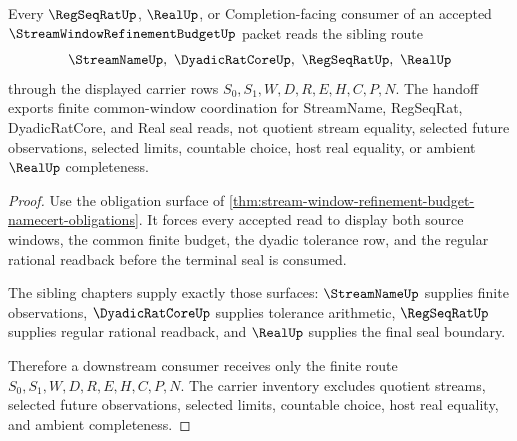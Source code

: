 \begin{theorem}
\label{thm:stream-window-refinement-budget-real-handoff}
Every $\RegSeqRatUp$, $\RealUp$, or Completion-facing consumer of an accepted $\StreamWindowRefinementBudgetUp$ packet reads the sibling route
$$
\StreamNameUp,\ \DyadicRatCoreUp,\ \RegSeqRatUp,\ \RealUp
$$
through the displayed carrier rows $S_0,S_1,W,D,R,E,H,C,P,N$. The handoff exports finite common-window coordination for StreamName, RegSeqRat, DyadicRatCore, and Real seal reads, not quotient stream equality, selected future observations, selected limits, countable choice, host real equality, or ambient $\RealUp$ completeness.
\end{theorem}
\begin{proof}
Use the obligation surface of \autoref{thm:stream-window-refinement-budget-namecert-obligations}. It forces every accepted read to display both source windows, the common finite budget, the dyadic tolerance row, and the regular rational readback before the terminal seal is consumed.

The sibling chapters supply exactly those surfaces: $\StreamNameUp$ supplies finite observations, $\DyadicRatCoreUp$ supplies tolerance arithmetic, $\RegSeqRatUp$ supplies regular rational readback, and $\RealUp$ supplies the final seal boundary.

Therefore a downstream consumer receives only the finite route $S_0,S_1,W,D,R,E,H,C,P,N$. The carrier inventory excludes quotient streams, selected future observations, selected limits, countable choice, host real equality, and ambient completeness.
\end{proof}


\begin{closurestatus}{\StreamWindowRefinementBudgetUp}
  \theoryclosure{\seedClosure}
  \formalstatus{\unformalizedV}
\end{closurestatus}
